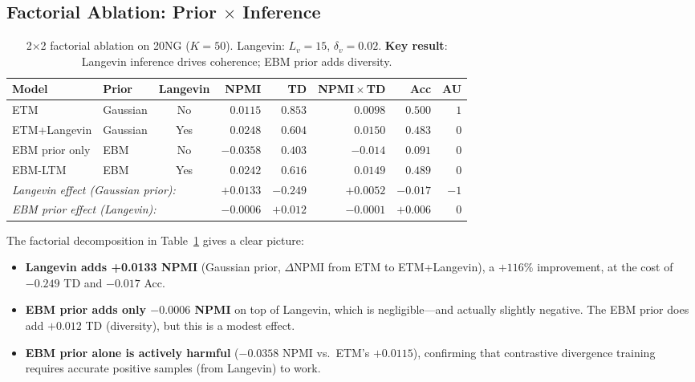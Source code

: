 \documentclass[10pt]{article}
\newcommand{\best}[1]{\textbf{#1}}
\newcommand{\second}[1]{\underline{#1}}
\begin{document}
\subsection{Factorial Ablation: Prior $\times$ Inference}
\label{sec:factorial}

\begin{table}[t]
\centering
\caption{2$\times$2 factorial ablation on 20NG ($K=50$).
    Langevin: $L_v=15$, $\delta_v=0.02$.
    \textbf{Key result}: Langevin inference drives coherence; EBM prior adds diversity.}
\label{tab:factorial}
\small
\begin{tabular}{llcrrrrr}
\hline
\textbf{Model} & \textbf{Prior} & \textbf{Langevin} &
    \textbf{NPMI} & \textbf{TD} & \textbf{NPMI$\!\times\!$TD} & \textbf{Acc} & \textbf{AU} \\
\hline
ETM             & Gaussian & No  & $0.0115$ & \best{$0.853$} & $0.0098$ & $0.500$ & \best{$1$} \\
ETM+Langevin    & Gaussian & Yes & \best{$0.0248$} & $0.604$ & \best{$0.0150$} & $0.483$ & 0 \\
EBM prior only  & EBM      & No  & $-0.0358$ & $0.403$ & $-0.014$ & $0.091$ & 0 \\
EBM-LTM         & EBM      & Yes & \second{$0.0242$} & \second{$0.616$} & \second{$0.0149$} & \second{$0.489$} & 0 \\
\hline
\multicolumn{3}{l}{\textit{Langevin effect (Gaussian prior):}} & $+0.0133$ & $-0.249$ & $+0.0052$ & $-0.017$ & $-1$ \\
\multicolumn{3}{l}{\textit{EBM prior effect (Langevin):}} & $-0.0006$ & $+0.012$ & $-0.0001$ & $+0.006$ & $0$ \\
\hline
\end{tabular}
\end{table}

The factorial decomposition in Table~\ref{tab:factorial} gives a clear picture:

\begin{itemize}
    \item \textbf{Langevin adds +0.0133 NPMI} (Gaussian prior, $\Delta$NPMI from ETM to ETM+Langevin),
          a $+116\%$ improvement, at the cost of $-0.249$ TD and $-0.017$ Acc.
    \item \textbf{EBM prior adds only $-0.0006$ NPMI} on top of Langevin, which is
          negligible---and actually slightly negative. The EBM prior does add $+0.012$ TD
          (diversity), but this is a modest effect.
    \item \textbf{EBM prior alone is actively harmful} ($-0.0358$ NPMI vs.\ ETM's $+0.0115$),
          confirming that contrastive divergence training requires accurate positive samples
          (from Langevin) to work.
\end{itemize}
\end{document}
